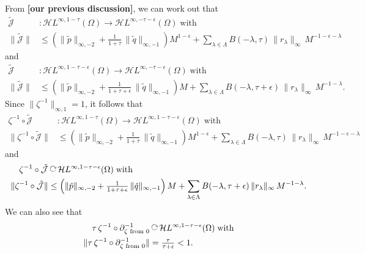 \documentclass{article}
\newcommand{\maps}{\colon}
\newcommand{\acts}{\mathbin{\raisebox{\depth}{\rotatebox{-90}{$\circlearrowright$}}}}
\newcommand{\holoL}[1]{\mathcal{H}L^{#1}} %
\begin{document}
From \textbf{[our previous discussion]}, we can work out that
\begin{align*}
\tilde{\mathcal{J}} & \maps \holoL{\infty, 1-\tau}(\Omega) \to \holoL{\infty, -\tau-\epsilon}(\Omega)\;\text{with} \\
\|\tilde{\mathcal{J}}\| & \le \left(\|\tilde{p}\|_{\infty, -2} + \tfrac{1}{1+\tau}\,\|\tilde{q}\|_{\infty, -1} \right) M^{1-\epsilon} + \sum_{\lambda \in \Lambda} B(-\lambda, \tau)\,\|r_\lambda\|_{\infty}\,M^{-1-\epsilon-\lambda}
\end{align*}
and
\begin{align*}
\tilde{\mathcal{J}} & \maps \holoL{\infty, 1-\tau-\epsilon}(\Omega) \to \holoL{\infty, -\tau-\epsilon}(\Omega)\;\text{with} \\
\|\tilde{\mathcal{J}}\| & \le \left(\|\tilde{p}\|_{\infty, -2} + \tfrac{1}{1+\tau+\epsilon}\,\|\tilde{q}\|_{\infty, -1} \right) M + \sum_{\lambda \in \Lambda} B(-\lambda, \tau+\epsilon)\,\|r_\lambda\|_{\infty}\,M^{-1-\lambda}.
\end{align*}
Since $\|\zeta^{-1}\|_{\infty, 1} = 1$, it follows that
\begin{align*}
\zeta^{-1} \circ \tilde{\mathcal{J}} & \maps \holoL{\infty, 1-\tau}(\Omega) \to \holoL{\infty, 1-\tau-\epsilon}(\Omega)\;\text{with} \\
\|\zeta^{-1} \circ \tilde{\mathcal{J}}\| & \le \left(\|\tilde{p}\|_{\infty, -2} + \tfrac{1}{1+\tau}\,\|\tilde{q}\|_{\infty, -1} \right) M^{1-\epsilon} + \sum_{\lambda \in \Lambda} B(-\lambda, \tau)\,\|r_\lambda\|_{\infty}\,M^{-1-\epsilon-\lambda} \label{bound:mollify}
\end{align*}
and
\begin{align}
\zeta^{-1} \circ \tilde{\mathcal{J}} & \acts \holoL{\infty, 1-\tau-\epsilon}(\Omega)\;\text{with} \\%
\|\zeta^{-1} \circ \tilde{\mathcal{J}}\| & \le \left(\|\tilde{p}\|_{\infty, -2} + \tfrac{1}{1+\tau+\epsilon}\,\|\tilde{q}\|_{\infty, -1} \right) M + \sum_{\lambda \in \Lambda} B(-\lambda, \tau+\epsilon)\,\|r_\lambda\|_{\infty}\,M^{-1-\lambda}. \label{bound:perturb}
\end{align}
We can also see that
\begin{align}
\tau\,\zeta^{-1} \circ \partial^{-1}_{\zeta \text{ from } 0} & \acts \holoL{\infty, 1-\tau-\epsilon}(\Omega)\;\text{with}   \nonumber \\
\|\tau\,\zeta^{-1} \circ \partial^{-1}_{\zeta \text{ from } 0}\| & = \tfrac{\tau}{\tau+\epsilon} < 1 \label{bound:contract}.
\end{align}
\end{document}
